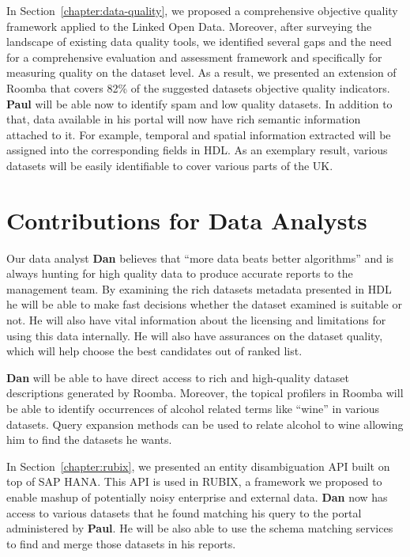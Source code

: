 \documentclass[a4paper,11pt,twoside]{ThesisStyle}
\begin{document}
In Section~\ref{chapter:data-quality}, we proposed a comprehensive objective quality framework applied to the Linked Open Data. Moreover, after surveying the landscape of existing data quality tools, we identified several gaps and the need for a comprehensive evaluation and assessment framework and specifically for measuring quality on the dataset level. As a result, we presented an extension of Roomba that covers 82\% of the suggested datasets objective quality indicators. \textbf{Paul} will be able now to identify spam and low quality datasets. In addition to that, data available in his portal will now have rich semantic information attached to it. For example, temporal and spatial information extracted will be assigned into the corresponding fields in HDL. As an exemplary result, various datasets will be easily identifiable to cover various parts of the UK.

\section{Contributions for Data Analysts}

Our data analyst \textbf{Dan} believes that ``more data beats better algorithms'' and is always hunting for high quality data to produce accurate reports to the management team. By examining the rich datasets metadata presented in HDL he will be able to make fast decisions whether the dataset examined is suitable or not. He will also have vital information about the licensing and limitations for using this data internally. He will also have assurances on the dataset quality, which will help choose the best candidates out of ranked list.

\textbf{Dan} will be able to have direct access to rich and high-quality dataset descriptions generated by Roomba. Moreover, the topical profilers in Roomba will be able to identify occurrences of alcohol related terms like ``wine'' in various datasets. Query expansion methods can be used to relate alcohol to wine allowing him to find the datasets he wants.

In Section~\ref{chapter:rubix}, we presented an entity disambiguation API built on top of SAP HANA. This API is used in RUBIX, a framework we proposed to enable mashup of potentially noisy enterprise and external data.
\textbf{Dan} now has access to various datasets that he found matching his query to the portal administered by \textbf{Paul}. He will be also able to use the schema matching services to find and merge those datasets in his reports.
\end{document}
